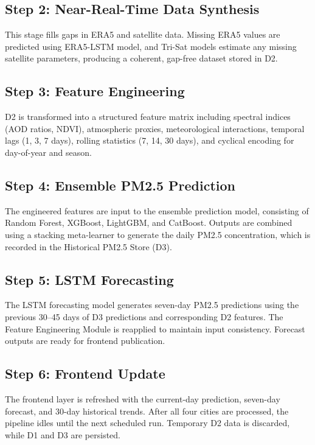 \documentclass[12pt]{report}
\begin{document}
\subsection*{Step 2: Near-Real-Time Data Synthesis}

This stage fills gaps in ERA5 and satellite data. Missing ERA5 values are predicted using ERA5-LSTM model, and Tri-Sat models estimate any missing satellite parameters, producing a coherent, gap-free dataset stored in D2.


\subsection*{Step 3: Feature Engineering}

D2 is transformed into a structured feature matrix including spectral indices (AOD ratios, NDVI), atmospheric proxies, meteorological interactions, temporal lags (1, 3, 7 days), rolling statistics (7, 14, 30 days), and cyclical encoding for day-of-year and season.


\subsection*{Step 4: Ensemble PM2.5 Prediction}

The engineered features are input to the ensemble prediction model, consisting of Random Forest, XGBoost, LightGBM, and CatBoost. Outputs are combined using a stacking meta-learner to generate the daily PM2.5 concentration, which is recorded in the Historical PM2.5 Store (D3).

\subsection*{Step 5: LSTM Forecasting}

The LSTM forecasting model generates seven-day PM2.5 predictions using the previous 30–45 days of D3 predictions and corresponding D2 features. The Feature Engineering Module is reapplied to maintain input consistency. Forecast outputs are ready for frontend publication.

\subsection*{Step 6: Frontend Update}

The frontend layer is refreshed with the current-day prediction, seven-day forecast, and 30-day historical trends. After all four cities are processed, the pipeline idles until the next scheduled run. Temporary D2 data is discarded, while D1 and D3 are persisted.
\end{document}
